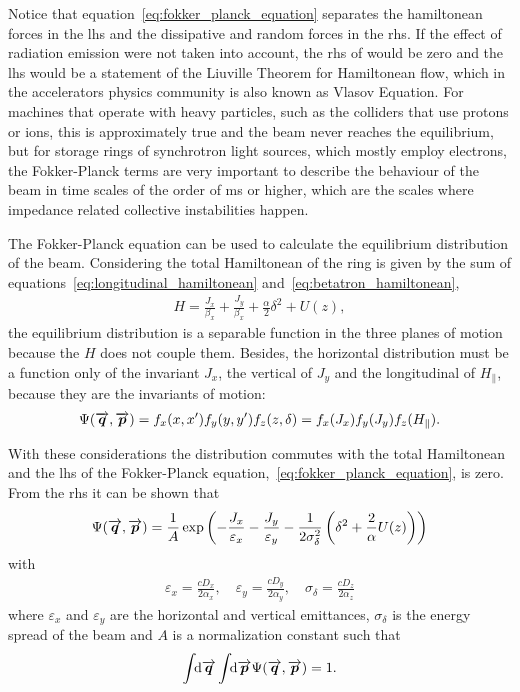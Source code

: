     Notice that equation~\eqref{eq:fokker_planck_equation} separates the hamiltonean forces in the \gls{lhs} and the dissipative and random forces in the \gls{rhs}. If the effect of radiation emission were not taken into account, the \gls{rhs} of would be zero and the \gls{lhs} would be a statement of the Liuville Theorem for Hamiltonean flow, which in the accelerators physics community is also known as Vlasov Equation. For machines that operate with heavy particles, such as the colliders that use protons or ions, this is approximately true and the beam never reaches the equilibrium, but for storage rings of synchrotron light sources, which mostly employ electrons, the Fokker-Planck terms are very important to describe the behaviour of the beam in time scales of the order of \si{\milli\second} or higher, which are the scales where impedance related collective instabilities happen.

    The Fokker-Planck equation can be used to calculate the equilibrium distribution of the beam. Considering the total Hamiltonean of the ring is given by the sum of equations~\eqref{eq:longitudinal_hamiltonean} and~\eqref{eq:betatron_hamiltonean},
    \begin{align}
        H = \frac{J_x}{\beta_x} + \frac{J_y}{\beta_x} + \frac\alpha2\delta^2 + U(z),
    \end{align}
    the equilibrium distribution is a separable function in the three planes of motion because the $H$ does not couple them. Besides, the horizontal distribution must be a function only of the invariant $J_x$, the vertical of $J_y$ and the longitudinal of $H_\parallel$, because they are the invariants of motion:
    \begin{align}
        \Psi(\overrightarrow{\boldsymbol{q}},\overrightarrow{\boldsymbol{p}}) =
        f_x(x,x')f_y(y,y')f_z(z,\delta) =
        f_x(J_x)f_y(J_y)f_z(H_\parallel).
    \end{align}

    With these considerations the distribution commutes with the total Hamiltonean and the \gls{lhs} of the Fokker-Planck equation,~\eqref{eq:fokker_planck_equation}, is zero. From the \gls{rhs} it can be shown that
    \begin{align}
        \Psi(\overrightarrow{\boldsymbol{q}},\overrightarrow{\boldsymbol{p}}) = \frac1A \exp\left(
                                - \frac{J_x}{\varepsilon_x}
                                - \frac{J_y}{\varepsilon_y}
                                - \frac{1}{2\sigma_\delta^2}\left(\delta^2 + \frac2\alpha U(z)\right)\right)
    \end{align}
    with
    \begin{align}
        \varepsilon_x = \frac{cD_x}{2\alpha_x}, \quad
        \varepsilon_y = \frac{cD_y}{2\alpha_y}, \quad
        \sigma_\delta = \frac{cD_z}{2\alpha_z}
    \end{align}
    where $\varepsilon_x$ and $\varepsilon_y$ are the horizontal and vertical emittances, $\sigma_\delta$ is the energy spread of the beam and $A$ is a normalization constant such that
    \begin{align}
        \int\!\!\text{d}\overrightarrow{\boldsymbol{q}} \int\!\!\text{d}\overrightarrow{\boldsymbol{p}} \Psi(\overrightarrow{\boldsymbol{q}},\overrightarrow{\boldsymbol{p}}) = 1.
    \end{align}

